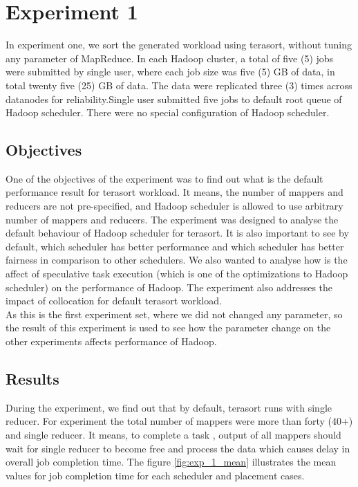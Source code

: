 \section{Experiment 1}

 In experiment one, we sort the generated workload using terasort, without tuning any parameter of MapReduce.  In each Hadoop cluster, a total of five (5) jobs were submitted by single user, where each job size was five (5) GB of data, in total twenty five (25) GB of data. The data were replicated three (3) times across datanodes for reliability.Single user submitted five jobs to default root queue of Hadoop scheduler.  There were no special configuration of Hadoop scheduler.\\  
 
 


\subsection{Objectives}
  
  One of the objectives of the experiment was to find out what is the default performance result for terasort workload. It means, the number of mappers and reducers are not pre-specified, and Hadoop scheduler is allowed to use arbitrary number of mappers and reducers. The experiment was designed to analyse the default behaviour of Hadoop scheduler for terasort. It is also important to see by default, which scheduler has better performance and which scheduler has better fairness in comparison to other schedulers. We also wanted to analyse how is the affect of speculative task execution (which is one of the optimizations to Hadoop scheduler)‌ on the performance of Hadoop. The experiment also addresses the impact of collocation for default terasort workload.\\
 
  As this is the first experiment set, where we did not changed any parameter, so the result of this experiment is used to see how the parameter change on the other experiments affects performance of Hadoop.\\  

 
\subsection{Results}
 
  During the experiment, we find out that by default, terasort runs with single reducer. For experiment the total number of mappers were more than forty (40+) and single reducer. It means, to complete a task , output of all mappers should wait for single reducer to become free and process the data which causes delay in overall job completion time. The figure \ref{fig:exp_1_mean} illustrates the mean values for job completion time for each scheduler and placement cases.\\
 

